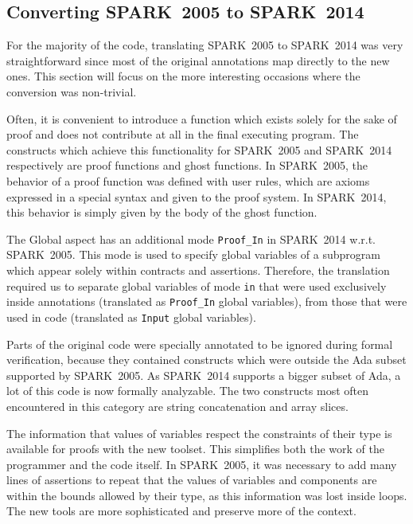 \documentclass[10pt,a4paper,twocolumn]{article}
\newcommand{\oldspark}{SPARK~2005\xspace}
\newcommand{\newspark}{SPARK~2014\xspace}
\newcommand{\wrt}{w.r.t.\xspace}
\begin{document}
\subsection{Converting \oldspark to \newspark}

For the majority of the code, translating \oldspark to \newspark was
very straightforward since most of the original annotations map
directly to the new ones. This section will focus on the more
interesting occasions where the conversion was non-trivial.

Often, it is convenient to introduce a function which exists solely
for the sake of proof and does not contribute at all in the final
executing program. The constructs which achieve this functionality for
\oldspark and \newspark respectively are proof functions and ghost
functions. In \oldspark, the behavior of a proof function was defined
with user rules, which are axioms expressed in a special syntax and
given to the proof system. In \newspark, this behavior is simply given
by the body of the ghost function.

The Global aspect has an additional mode \verb|Proof_In| in \newspark
\wrt \oldspark. This mode is used to specify global variables of a
subprogram which appear solely within contracts and
assertions. Therefore, the translation required us to separate global
variables of mode \verb|in| that were used exclusively inside
annotations (translated as \verb|Proof_In| global variables), from
those that were used in code (translated as \verb|Input| global
variables).

Parts of the original code were specially annotated to be ignored
during formal verification, because they contained constructs which
were outside the Ada subset supported by \oldspark. As \newspark
supports a bigger subset of Ada, a lot of this code is now formally
analyzable. The two constructs most often encountered in this category
are string concatenation and array slices.

The information that values of variables respect the constraints of
their type is available for proofs with the new toolset. This
simplifies both the work of the programmer and the code itself. In
\oldspark, it was necessary to add many lines of assertions to repeat
that the values of variables and components are within the bounds
allowed by their type, as this information was lost inside loops. The
new tools are more sophisticated and preserve more of the context.

\end{document}
